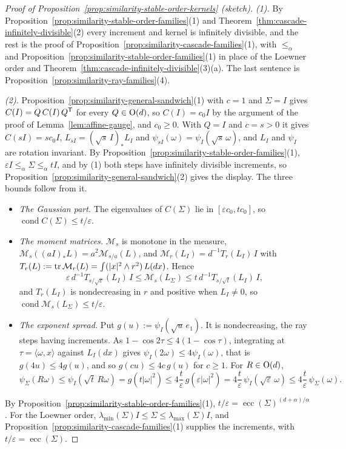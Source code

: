 \begin{proof}[Proof of Proposition~\ref{prop:similarity-stable-order-kernels} (sketch)]
\emph{(1).} By Proposition~\ref{prop:similarity-stable-order-families}(1) and Theorem~\ref{thm:cascade-infinitely-divisible}(2) every increment and kernel is
infinitely divisible, and the rest is the proof of Proposition~\ref{prop:similarity-cascade-families}(1),
with $\le_\alpha$ and Proposition~\ref{prop:similarity-stable-order-families}(1) in place of the Loewner
order and Theorem~\ref{thm:cascade-infinitely-divisible}(3)(a).
The last sentence is Proposition~\ref{prop:similarity-ray-families}(4).

\emph{(2).} Proposition~\ref{prop:similarity-general-sandwich}(1) with $c = 1$ and $\Sigma = I$ gives
$C(I) = Q\,C(I)\,Q^{\mathsf{T}}$ for every $Q \in \mathrm{O}(d)$, so $C(I) = c_0I$ by the argument of the proof of
Lemma~\ref{lem:affine-gauge}, and $c_0 \ge 0$. With $Q = I$ and $c = s > 0$ it gives $C(sI) = sc_0I$,
$L_{sI} = (\sqrt s\,I)_*L_I$ and $\psi_{sI}(\omega) = \psi_I(\sqrt s\,\omega)$, and $L_I$ and $\psi_I$ are
rotation invariant. By Proposition~\ref{prop:similarity-stable-order-families}(1), $\varepsilon I \le_\alpha \Sigma \le_\alpha tI$, and by (1) both steps have
infinitely divisible increments, so Proposition~\ref{prop:similarity-general-sandwich}(2) gives the
display. The three bounds follow from it.
\begin{itemize}
\item \emph{The Gaussian part.} The eigenvalues of $C(\Sigma)$ lie in $[\varepsilon c_0, tc_0]$, so
$\operatorname{cond}C(\Sigma) \le t/\varepsilon$.
\item \emph{The moment matrices.} $\mathcal M_s$ is monotone in the \Levy{} measure,
$\mathcal M_s((aI)_*L) = a^2\mathcal M_{s/a}(L)$, and $\mathcal M_r(L_I) = d^{-1}T_r(L_I)\,I$ with
$T_r(L) := \operatorname{tr}\mathcal M_r(L) = \int(|x|^2 \wedge r^2)\,L(dx)$. Hence
\[
  \varepsilon\,d^{-1}T_{s/\sqrt\varepsilon}(L_I)\,I \le \mathcal M_s(L_\Sigma) \le t\,d^{-1}T_{s/\sqrt t}(L_I)\,I ,
\]
and $T_r(L_I)$ is nondecreasing in $r$ and positive when $L_I \ne 0$, so
$\operatorname{cond}\mathcal M_s(L_\Sigma) \le t/\varepsilon$.
\item \emph{The exponent spread.} Put $g(u) := \psi_I(\sqrt u\,e_1)$. It is nondecreasing, the ray steps
having increments. As $1 - \cos 2\tau \le 4(1 - \cos\tau)$, integrating at $\tau = \langle \omega,x\rangle$
against $L_I(dx)$ gives $\psi_I(2\omega) \le 4\psi_I(\omega)$, that is $g(4u) \le 4g(u)$, and so $g(cu) \le 4c\,g(u)$ for $c \ge 1$. For $R \in \mathrm{O}(d)$,
\[
  \psi_\Sigma(R\omega) \le \psi_I(\sqrt t\,R\omega) = g(t|\omega|^2) \le 4\frac{t}{\varepsilon}\,g(\varepsilon|\omega|^2)
  = 4\frac{t}{\varepsilon}\,\psi_I(\sqrt\varepsilon\,\omega) \le 4\frac{t}{\varepsilon}\,\psi_\Sigma(\omega) .
\]
\end{itemize}
By Proposition~\ref{prop:similarity-stable-order-families}(1), $t/\varepsilon =  \operatorname{ecc}(\Sigma)^{(d+\alpha)/\alpha}$. For the Loewner order,
$\lambda_{\min}(\Sigma)I \le \Sigma \le \lambda_{\max}(\Sigma)I$, and
Proposition~\ref{prop:similarity-cascade-families}(1) supplies the increments, with
$t/\varepsilon = \operatorname{ecc}(\Sigma)$.


\end{proof}
